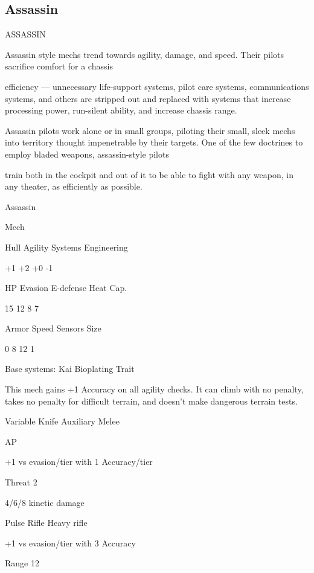 \subsection{Assassin}

                                                 ASSASSIN  

Assassin style mechs trend towards agility, damage, and speed. Their pilots sacrifice comfort for a chassis  

efficiency — unnecessary life-support systems, pilot care systems, communications systems, and others  
are stripped out and replaced with systems that increase processing power, run-silent ability, and increase  
chassis range.   

Assassin pilots work alone or in small groups, piloting their small, sleek mechs into territory thought  
impenetrable by their targets. One of the few doctrines to employ bladed weapons, assassin-style pilots  

train both in the cockpit and out of it to be able to fight with any weapon, in any theater, as efficiently as  
possible.   

 Assassin 

 Mech 

 Hull        Agility      Systems        Engineering 

 +1          +2           +0             -1 

 HP          Evasion      E-defense      Heat Cap. 

  15         12           8              7 

 Armor       Speed        Sensors       Size 

 0           8            12             1 

Base systems:  
Kai Bioplating  
Trait
 
This mech gains +1 Accuracy on all agility checks. It can climb with no penalty, takes no penalty  
for difficult terrain, and doesn’t make dangerous terrain tests.
 

Variable Knife  
Auxiliary Melee
 
AP
 
+1 vs evasion/tier with 1 Accuracy/tier
 
Threat 2
 
4/6/8 kinetic damage
 

Pulse Rifle  
Heavy rifle
 
+1 vs evasion/tier with 3 Accuracy
 
Range 12
 
